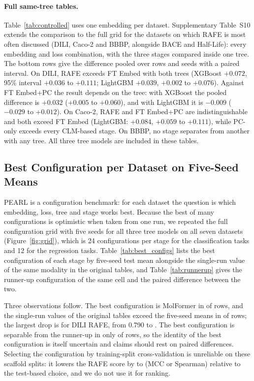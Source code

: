 \documentclass[pdflatex,sn-mathphys-num,Numbered]{sn-jnl}%
\begin{document}
\paragraph{Full same-tree tables.} Table~\ref{tab:controlled} uses one embedding per dataset. Supplementary Table~S10 extends the comparison to the full grid for the datasets on which RAFE is most often discussed (DILI, Caco-2 and BBBP, alongside BACE and Half-Life): every embedding and loss combination, with the three stages compared inside one tree. The bottom rows give the difference pooled over rows and seeds with a paired interval. On DILI, RAFE exceeds FT Embed with both trees (XGBoost $+0.072$, 95\% interval $+0.036$ to $+0.111$; LightGBM $+0.039$, $+0.002$ to $+0.076$). Against FT Embed+PC the result depends on the tree: with XGBoost the pooled difference is $+0.032$ ($+0.005$ to $+0.060$), and with LightGBM it is $-0.009$ ($-0.029$ to $+0.012$). On Caco-2, RAFE and FT Embed+PC are indistinguishable and both exceed FT Embed (LightGBM: $+0.084$, $+0.059$ to $+0.111$), while PC-only exceeds every CLM-based stage. On BBBP, no stage separates from another with any tree. All three tree models are included in these tables.

\FloatBarrier
\subsection{Best Configuration per Dataset on Five-Seed Means}\label{sec:best_configs}
PEARL is a configuration benchmark: for each dataset the question is which embedding, loss, tree and stage works best. Because the best of many configurations is optimistic when taken from one run, we repeated the full configuration grid with five seeds for all three tree models on all seven datasets (Figure~\ref{fig:grid}), which is 24 configurations per stage for the classification tasks and 12 for the regression tasks. Table~\ref{tab:best_configs} lists the best configuration of each stage by five-seed test mean alongside the single-run value of the same modality in the original tables, and Table~\ref{tab:runnerup} gives the runner-up configuration of the same cell and the paired difference between the two.

Three observations follow. The best configuration is MolFormer in \nmf{} of \nrows{} rows, and the single-run values of the original tables exceed the five-seed means in \nsr{} of \nrows{} rows; the largest drop is for DILI RAFE, from 0.790 to \mDILIRAFE{}. The best configuration is separable from the runner-up in only \nsep{} of \nrows{} rows, so the identity of the best configuration is itself uncertain and claims should rest on paired differences. Selecting the configuration by training-split cross-validation is unreliable on these scaffold splits: it lowers the RAFE score by \gaplo{} to \gaphi{} (MCC or Spearman) relative to the test-based choice, and we do not use it for ranking.
\end{document}
